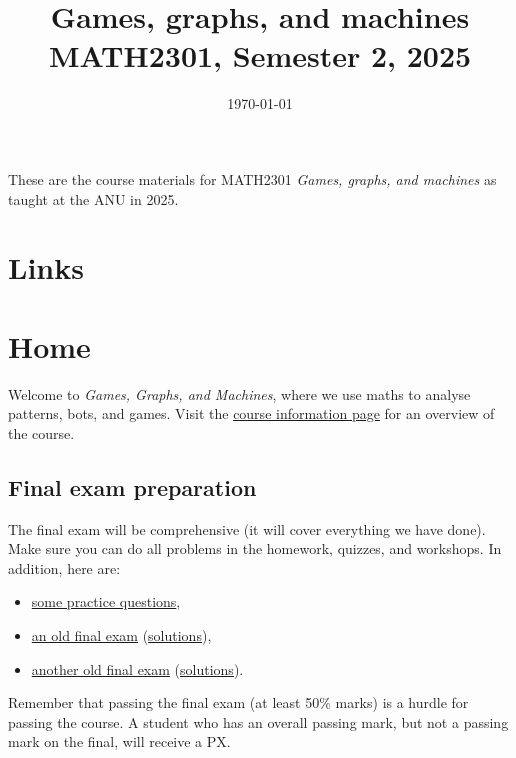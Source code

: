 \documentclass{amsart}
\date{\today}
\title{Games, graphs, and machines\\\medskip
\large MATH2301, Semester 2, 2025}
\begin{document}
\maketitle

These are the course materials for MATH2301 \emph{Games, graphs, and machines} as taught at the ANU in 2025.
\section{Links}
\label{sec:org19f535b}
\section{Home}
\label{sec:org18ae415}
Welcome to \emph{Games, Graphs, and Machines}, where we use maths to analyse patterns, bots, and games.
Visit the \href{https://canvas.anu.edu.au/courses/2640/pages/course-information}{course information page} for an overview of the course.
\subsection{Final exam preparation}
\label{sec:orgd9c9c4d}
The final exam will be comprehensive (it will cover everything we have done).  Make sure you can do all problems in the homework, quizzes, and workshops.  In addition, here are:

\begin{itemize}
\item \href{https://canvas.anu.edu.au/files/1249508/download?download\_frd=1\&verifier=tnwuCvGyEVaPW0aQdy7AGDbEJ0v8JoMZlXQNfvub}{some practice questions},
\item \href{https://canvas.anu.edu.au/files/1249510/download?download\_frd=1\&verifier=EkuuAkRhv83dvqH5AVzgnhXvqOsR79n5kAwBzqLh}{an old final exam} (\href{https://canvas.anu.edu.au/files/1345874/download?download\_frd=1\&verifier=fBTrdLUQ5OWTkxYK23a4hMub5VL8wmwyNSLh8Mur}{solutions}),
\item \href{https://canvas.anu.edu.au/files/1249511/download?download\_frd=1\&verifier=mLorkBPOgbBmE4VsUB19WHn1c6U44wXOY51N40Wh}{another old final exam} (\href{https://canvas.anu.edu.au/files/1347176/download?download\_frd=1\&verifier=SIgtBTiK10tfgvLHm3y8ipCOfIcrdNFoDDKU23bK}{solutions}).
\end{itemize}

Remember that passing the final exam (at least 50\% marks) is a hurdle for passing the course.  A student who has an overall passing mark, but not a passing mark on the final, will receive a PX. 
\end{document}
